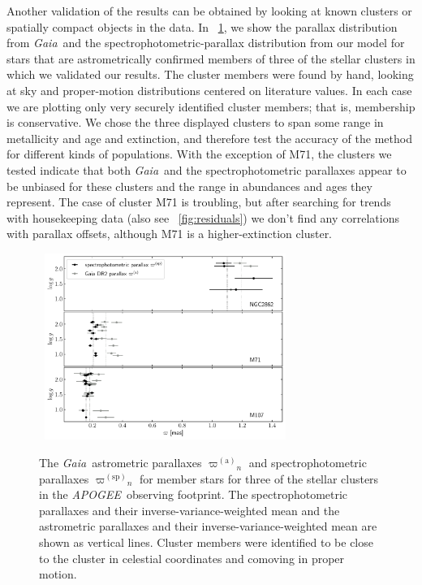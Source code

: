\documentclass[modern]{aastex62}
\newcommand{\acronym}[1]{{\small{#1}}}
\newcommand{\project}[1]{\textsl{#1}}
\newcommand{\apogee}{\project{\acronym{APOGEE}}}
\newcommand{\gaia}{\project{Gaia}}
\newcommand{\gparallax}{{\varpi^{(\mathrm{a})}}}
\newcommand{\sparallax}{{\varpi^{(\mathrm{sp})}}}
\begin{document}
Another validation of the results can be obtained by looking at known
clusters or spatially compact objects in the data.
In \figurename~\ref{fig:clusters}, we show the parallax distribution from \gaia\ and
the spectrophotometric-parallax distribution from our model for stars that are
astrometrically confirmed members of three of the stellar clusters in which we
validated our results.
The cluster members were found by hand, looking at sky and proper-motion distributions
centered on literature values.
In each case we are plotting only very securely identified cluster members; that
is, membership is conservative.
We chose the three displayed clusters
to span some range in metallicity and age and extinction, and therefore test
the accuracy of the method for different kinds of populations.
With the exception of \acronym{M71}, the clusters we tested
indicate that both \gaia\ and the spectrophotometric parallaxes appear to be unbiased
for these clusters and the range in abundances and ages they represent.
The case of cluster \acronym{M71} is troubling, but after searching for trends with
housekeeping data (also see \figurename~\ref{fig:residuals}) we don't find any correlations
with parallax offsets, although \acronym{M71} is a higher-extinction cluster.
\begin{figure}
~\hfill\includegraphics[width=0.7\textwidth]{clusters.pdf}\hfill~
\caption{The \gaia\ astrometric parallaxes $\gparallax_n$
  and spectrophotometric parallaxes $\sparallax_n$ for member stars for
  three of the stellar clusters in the \apogee\ observing footprint. The spectrophotometric
  parallaxes and their inverse-variance-weighted mean and the astrometric parallaxes
  and their inverse-variance-weighted mean
  are shown as vertical lines.
  Cluster members were identified to be close to the cluster in celestial coordinates
  and comoving in proper motion.\label{fig:clusters}}
\end{figure}
\end{document}
